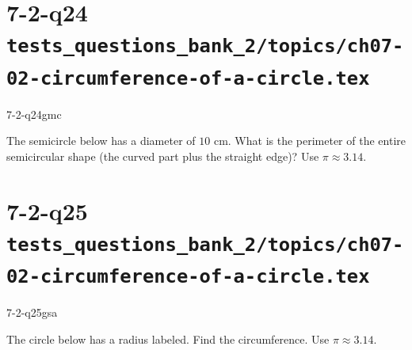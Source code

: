 \documentclass[12pt, fleqn, openany]{studyGuide}
\begin{document}
\newpage
\section*{7-2-q24 \hfill \normalsize\texttt{tests\_questions\_bank\_2/topics/ch07-02-circumference-of-a-circle.tex}}
\begin{practiceQuestion}{7-2-q24}{gmc}
\begin{questionText}
The semicircle below has a diameter of $10$ cm. What is the perimeter of the entire semicircular shape (the curved part plus the straight edge)? Use $\pi \approx 3.14$.

\begin{center}
\end{center}
\end{questionText}
\end{practiceQuestion}

\newpage
\section*{7-2-q25 \hfill \normalsize\texttt{tests\_questions\_bank\_2/topics/ch07-02-circumference-of-a-circle.tex}}
\begin{practiceQuestion}{7-2-q25}{gsa}
\begin{questionText}
The circle below has a radius labeled. Find the circumference. Use $\pi \approx 3.14$.

\begin{center}
\end{center}
\end{questionText}
\end{practiceQuestion}
\end{document}
